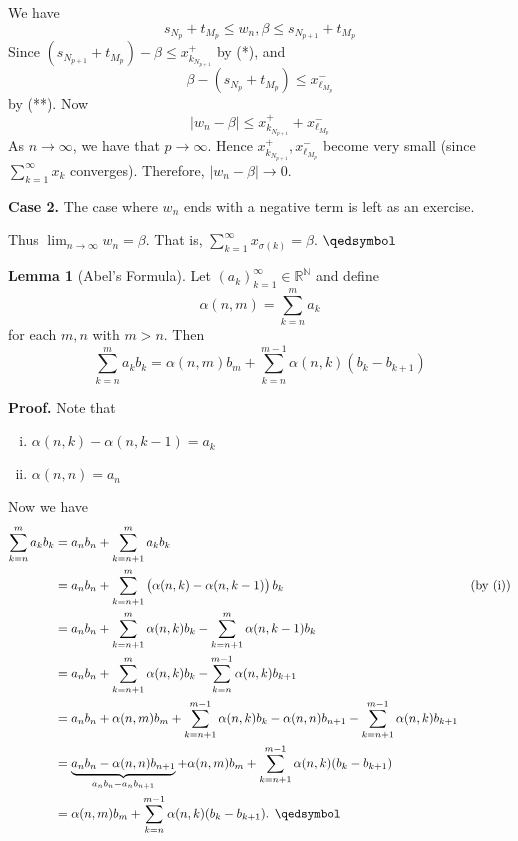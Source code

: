\documentclass[11pt]{article}
\theoremstyle{definition}
\newtheorem{lemma}[thm]{Lemma}
\newcommand{\mbN}{\ensuremath{\mathbb{N}}}
\newcommand{\mbR}{\ensuremath{\mathbb{R}}}
\begin{document}
We have
$$s_{N_p} + t_{M_p} \leq w_n, \beta \leq s_{N_{p+1}} + t_{M_p}$$
Since $(s_{N_{p+1}} + t_{M_p}) - \beta \leq x_{k_{N_{p+1}}}^+$ by (*), and
$$\beta - (s_{N_p} + t_{M_p}) \leq x_{\ell_{M_p}}^-$$
by (**). Now
$$|w_n - \beta| \leq x_{k_{N_{p+1}}}^+ + x_{\ell_{M_p}}^-$$
As $n \to \infty$, we have that $p \to \infty$. Hence $x_{k_{N_{p+1}}}^+, x_{\ell_{M_p}}^-$ become very small (since $\sum_{k=1}^\infty x_k$ converges).
Therefore, $|w_n - \beta| \to 0$.

\textbf{Case 2.} The case where $w_n$ ends with a negative term is left as an exercise. 

Thus $\lim_{n\to\infty} w_n = \beta$. That is, $\sum_{k=1}^\infty x_{\sigma(k)} = \beta$. $\qedsymbol$

\begin{lemma}[Abel's Formula]
Let $(a_k)_{k=1}^\infty \in \mbR^\mbN$ and define
$$\alpha(n, m) = \sum_{k=n}^m a_k$$
for each $m, n$ with $m > n$. Then
$$\sum_{k=n}^m a_k b_k = \alpha(n, m) b_m + \sum_{k=n}^{m-1} \alpha(n, k) (b_k - b_{k+1})$$
\end{lemma}
\textbf{Proof.} Note that
\begin{enumerate}[(i)] \vspace{-0.2cm}
\item $\alpha(n, k) - \alpha(n, k-1) = a_k$
\item $\alpha(n, n) = a_n$
\end{enumerate}

Now we have
\begin{align*}
\sum_{k=n}^m a_k b_k & = a_n b_n + \sum_{k=n+1}^m a_k b_k \\
& = a_n b_n + \sum_{k=n+1}^m \left( \alpha(n, k) - \alpha(n, k-1) \right) b_k & \text{(by (i))} \\
& = a_n b_n + \sum_{k=n+1}^m \alpha(n, k) b_k - \sum_{k=n+1}^m \alpha(n, k-1) b_k \\
& = a_n b_n + \sum_{k=n+1}^m \alpha(n, k) b_k - \sum_{k=n}^{m-1} \alpha(n, k) b_{k+1} \\
& = a_n b_n + \alpha(n, m) b_m + \sum_{k=n+1}^{m-1} \alpha(n, k) b_k - \alpha(n, n) b_{n+1} - \sum_{k=n+1}^{m-1} \alpha(n, k) b_{k+1} \\
& = \underbrace{a_n b_n - \alpha(n, n) b_{n+1}}_{a_n b_n - a_n b_{n+1}} + \alpha(n, m) b_m + \sum_{k=n+1}^{m-1} \alpha(n, k) (b_k - b_{k+1}) \\
& = \alpha(n, m) b_m + \sum_{k=n}^{m-1} \alpha(n, k) (b_k - b_{k+1}) \text{. } \qedsymbol
\end{align*}
\end{document}
